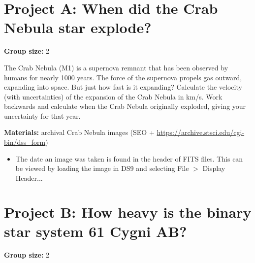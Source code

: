 %
%

\section{Project A: When did the Crab Nebula star explode?}

\textbf{Group size:} 2

The Crab Nebula (M1) is a supernova remnant that has been observed by humans for nearly 1000 years. The force of the supernova propels gas outward, expanding into space. But just how fast is it expanding? Calculate the velocity (with uncertainties) of the expansion of the Crab Nebula in km/s. Work backwards and calculate when the Crab Nebula originally exploded, giving your uncertainty for that year.

\textbf{Materials:} archival Crab Nebula images (SEO + \url{https://archive.stsci.edu/cgi-bin/dss_form})

\begin{itemize}
	\item The date an image was taken is found in the header of FITS files. This can be viewed by loading the image in DS9 and selecting File $>$ Display Header...
\end{itemize}

\section{Project B: How heavy is the binary star system 61 Cygni AB?}
\textbf{Group size:} 2


